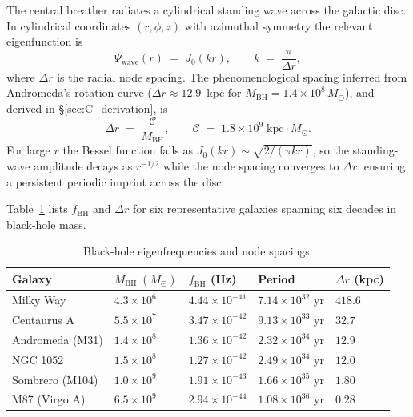 \documentclass[11pt,a4paper]{article}
\begin{document}
The central breather radiates a cylindrical standing wave across the galactic disc.  In
cylindrical coordinates $(r,\phi,z)$ with azimuthal symmetry the relevant eigenfunction is
\begin{equation}
  \Psi_\mathrm{wave}(r) \;=\; J_0(k r), \qquad k \;=\; \frac{\pi}{\Delta r},
  \label{eq:bessel}
\end{equation}
where $\Delta r$ is the radial node spacing.  The phenomenological spacing inferred from
Andromeda's rotation curve ($\Delta r \approx 12.9$~kpc for
$M_\mathrm{BH} = 1.4\times10^8\,M_\odot$), and derived in
\S\ref{sec:C_derivation}, is
\begin{equation}
  \boxed{\Delta r \;=\; \frac{\mathcal{C}}{M_\mathrm{BH}}, \qquad
  \mathcal{C} \;=\; 1.8\times10^9\;\mathrm{kpc}\cdot M_\odot.}
  \label{eq:dr}
\end{equation}
For large $r$ the Bessel function falls as $J_0(kr)\sim\sqrt{2/(\pi kr)}$, so the
standing-wave amplitude decays as $r^{-1/2}$ while the node spacing converges to $\Delta r$,
ensuring a persistent periodic imprint across the disc.

Table~\ref{tab:galaxies} lists $f_\mathrm{BH}$ and $\Delta r$ for six representative
galaxies spanning six decades in black-hole mass.

\begin{table}[H]
\centering
\caption{Black-hole eigenfrequencies and node spacings.}
\label{tab:galaxies}
\begin{tabular}{@{}lllll@{}}
\toprule
Galaxy & $M_\mathrm{BH}\;(M_\odot)$ & $f_\mathrm{BH}$ (Hz) & Period & $\Delta r$ (kpc) \\
\midrule
Milky Way       & $4.3\times10^{6}$  & $4.44\times10^{-41}$ & $7.14\times10^{32}$ yr & $418.6$ \\
Centaurus A     & $5.5\times10^{7}$  & $3.47\times10^{-42}$ & $9.13\times10^{33}$ yr & $32.7$  \\
Andromeda (M31) & $1.4\times10^{8}$  & $1.36\times10^{-42}$ & $2.32\times10^{34}$ yr & $12.9$  \\
NGC 1052        & $1.5\times10^{8}$  & $1.27\times10^{-42}$ & $2.49\times10^{34}$ yr & $12.0$  \\
Sombrero (M104) & $1.0\times10^{9}$  & $1.91\times10^{-43}$ & $1.66\times10^{35}$ yr & $1.80$  \\
M87 (Virgo A)   & $6.5\times10^{9}$  & $2.94\times10^{-44}$ & $1.08\times10^{36}$ yr & $0.28$  \\
\bottomrule
\end{tabular}
\end{table}
\end{document}
